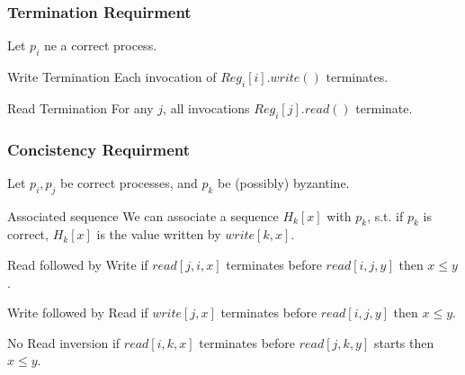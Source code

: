 \begin{frame}
    \frametitle{Termination Requirment}
    Let $p_i$ ne a correct process.
    \begin{block}{Write Termination}
        Each invocation of $Reg_i[i].write()$ terminates.
    \end{block}
    \begin{block}{Read Termination}
        For any $j$, all invocations $Reg_i[j].read()$ terminate.
    \end{block}
\end{frame}
\begin{frame}
    \frametitle{Concistency Requirment}
    Let $p_i, p_j$ be correct processes, and $p_k$ be (possibly) byzantine.
    \begin{block}{Associated sequence}
        We can associate a sequence $H_k[x]$ with $p_k$, s.t. if $p_k$ is correct,
        $H_k[x]$ is the value written by $write[k,x]$.
    \end{block}
    \begin{block}{Read followed by Write}
        if $read[j,i,x]$ terminates before $read[i,j,y]$ then $x\leq y$.
    \end{block}
    \begin{block}{Write followed by Read}
        if $write[j,x]$ terminates before $read[i,j,y]$ then $x\leq y$.
    \end{block}
    \begin{block}{No Read inversion}
        if $read[i,k,x]$ terminates before $read[j,k,y]$ starts then $x\leq y$.
    \end{block}

    
\end{frame}